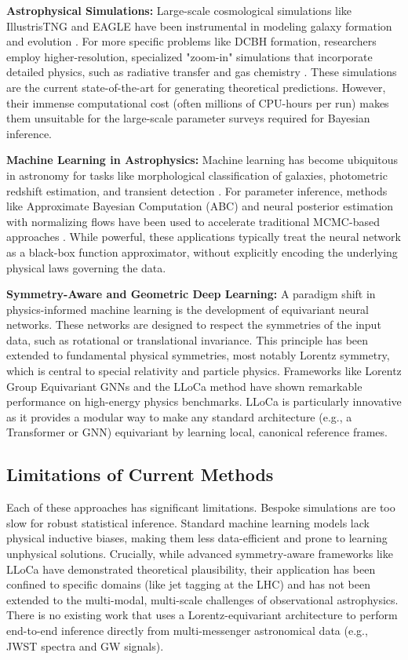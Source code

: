 \documentclass[11pt, a4paper]{article}
\begin{document}
\textbf{Astrophysical Simulations:} Large-scale cosmological simulations like IllustrisTNG and EAGLE have been instrumental in modeling galaxy formation and evolution \cite{pillepich2018}. For more specific problems like DCBH formation, researchers employ higher-resolution, specialized "zoom-in" simulations that incorporate detailed physics, such as radiative transfer and gas chemistry \cite{paper2_sim}. These simulations are the current state-of-the-art for generating theoretical predictions. However, their immense computational cost (often millions of CPU-hours per run) makes them unsuitable for the large-scale parameter surveys required for Bayesian inference.

\textbf{Machine Learning in Astrophysics:} Machine learning has become ubiquitous in astronomy for tasks like morphological classification of galaxies, photometric redshift estimation, and transient detection \cite{mehta2019}. For parameter inference, methods like Approximate Bayesian Computation (ABC) and neural posterior estimation with normalizing flows have been used to accelerate traditional MCMC-based approaches \cite{cranmer2020}. While powerful, these applications typically treat the neural network as a black-box function approximator, without explicitly encoding the underlying physical laws governing the data.

\textbf{Symmetry-Aware and Geometric Deep Learning:} A paradigm shift in physics-informed machine learning is the development of equivariant neural networks. These networks are designed to respect the symmetries of the input data, such as rotational or translational invariance. This principle has been extended to fundamental physical symmetries, most notably Lorentz symmetry, which is central to special relativity and particle physics. Frameworks like Lorentz Group Equivariant GNNs and the LLoCa method \cite{paper1_lloca} have shown remarkable performance on high-energy physics benchmarks. LLoCa is particularly innovative as it provides a modular way to make any standard architecture (e.g., a Transformer or GNN) equivariant by learning local, canonical reference frames.

\subsection{Limitations of Current Methods}
Each of these approaches has significant limitations. Bespoke simulations are too slow for robust statistical inference. Standard machine learning models lack physical inductive biases, making them less data-efficient and prone to learning unphysical solutions. Crucially, while advanced symmetry-aware frameworks like LLoCa have demonstrated theoretical plausibility, their application has been confined to specific domains (like jet tagging at the LHC) and has not been extended to the multi-modal, multi-scale challenges of observational astrophysics. There is no existing work that uses a Lorentz-equivariant architecture to perform end-to-end inference directly from multi-messenger astronomical data (e.g., JWST spectra and GW signals).
\end{document}
